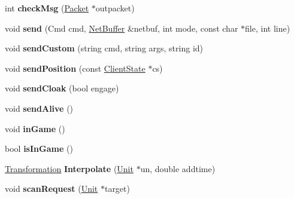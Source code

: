 \begin{DoxyCompactItemize}
\item 
int {\bfseries check\+Msg} (\hyperlink{classPacket}{Packet} $\ast$outpacket)\hypertarget{classNetClient_a396cbb06098bfbeeb06994b6265ec47d}{}\label{classNetClient_a396cbb06098bfbeeb06994b6265ec47d}

\item 
void {\bfseries send} (Cmd cmd, \hyperlink{classNetBuffer}{Net\+Buffer} \&netbuf, int mode, const char $\ast$file, int line)\hypertarget{classNetClient_aa44efb592eb858a33c377c642d61c075}{}\label{classNetClient_aa44efb592eb858a33c377c642d61c075}

\item 
void {\bfseries send\+Custom} (string cmd, string args, string id)\hypertarget{classNetClient_a40f5887c1cd72295cfcd8d256f409b85}{}\label{classNetClient_a40f5887c1cd72295cfcd8d256f409b85}

\item 
void {\bfseries send\+Position} (const \hyperlink{classClientState}{Client\+State} $\ast$cs)\hypertarget{classNetClient_a21732d7884ae5bd5929e9cbcc21f5a96}{}\label{classNetClient_a21732d7884ae5bd5929e9cbcc21f5a96}

\item 
void {\bfseries send\+Cloak} (bool engage)\hypertarget{classNetClient_a0cbbacf2d18590c7d4e6701862b6863b}{}\label{classNetClient_a0cbbacf2d18590c7d4e6701862b6863b}

\item 
void {\bfseries send\+Alive} ()\hypertarget{classNetClient_a55b63ce67bf05b71c03629551879e11a}{}\label{classNetClient_a55b63ce67bf05b71c03629551879e11a}

\item 
void {\bfseries in\+Game} ()\hypertarget{classNetClient_a4bd696445598a6e5b0f51451e011afd8}{}\label{classNetClient_a4bd696445598a6e5b0f51451e011afd8}

\item 
bool {\bfseries is\+In\+Game} ()\hypertarget{classNetClient_a9b7cf2a9e64fc3080198927c6ec9b05e}{}\label{classNetClient_a9b7cf2a9e64fc3080198927c6ec9b05e}

\item 
\hyperlink{structTransformation}{Transformation} {\bfseries Interpolate} (\hyperlink{classUnit}{Unit} $\ast$un, double addtime)\hypertarget{classNetClient_a3954be6d9363efdefc2ebd682530a786}{}\label{classNetClient_a3954be6d9363efdefc2ebd682530a786}

\item 
void {\bfseries scan\+Request} (\hyperlink{classUnit}{Unit} $\ast$target)\hypertarget{classNetClient_aaf9cfb624490e64e1be70887391ec5e7}{}\label{classNetClient_aaf9cfb624490e64e1be70887391ec5e7}


\end{DoxyCompactItemize}
